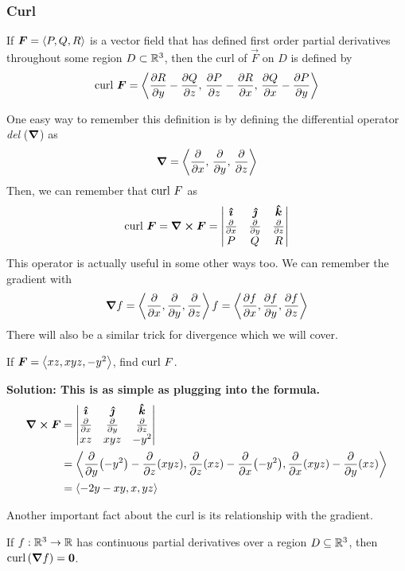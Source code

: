 \subsubsection{Curl}
\begin{definition}
    If $\boldsymbol{F} = \left\langle P, Q, R\right\rangle$ is a vector field that has defined first order partial derivatives throughout some region $D\subset \mathbb{R}^3$, then the curl of $\vec F$ on $D$ is defined by
    \[ \operatorname{curl}\, \boldsymbol{F} = \left\langle\pdv{R}{y}-\pdv{Q}{z},\, \pdv{P}{z}-\pdv{R}{x},\,\pdv{Q}{x}-\pdv{P}{y}\right\rangle\]
\end{definition}
One easy way to remember this definition is by defining the differential operator \textit{del} ($\boldsymbol{\boldsymbol\nabla}$) as
\[ \boldsymbol{\boldsymbol\nabla} = \left\langle \pdv{}{x}, \, \pdv{}{y},\,\pdv{}{z}\right\rangle\]
Then, we can remember that $\operatorname{curl}\, F$ as
\[ \operatorname{curl}\, \boldsymbol{F} = \curl\boldsymbol{F} = \begin{vmatrix}
    \boldsymbol{\hat{\imath}} & \boldsymbol{\hat{\jmath}} & \boldsymbol{\hat{k}} \\
    \pdv{}{x} & \pdv{}{y} & \pdv{}{z} \\
    P & Q & R
\end{vmatrix}    
\]
This operator is actually useful in some other ways too. We can remember the gradient with
\[ \boldsymbol\nabla f = \left\langle \pdv{}{x}, \pdv{}{y}, \pdv{}{z}\right\rangle f = \left\langle \pdv{f}{x}, \pdv{f}{y}, \pdv{f}{z}\right\rangle\]
There will also be a similar trick for divergence which we will cover. \par
\begin{example}
    If $\boldsymbol{F} = \left\langle xz, xyz, -y^2\right\rangle$, find $\operatorname{curl}\, F$. \par
    \bf{Solution:} This is as simple as plugging into the formula.
    \begin{align*}
        \curl \boldsymbol{F} &=  \begin{vmatrix}
    \boldsymbol{\hat{\imath}} & \boldsymbol{\hat{\jmath}} & \boldsymbol{\hat{k}} \\
    \pdv{}{x} & \pdv{}{y} & \pdv{}{z} \\
    xz & xyz & -y^2
\end{vmatrix} \\ &= \left\langle \pdv{y}(-y^2) - \pdv{z}(xyz), \pdv{z}(xz) - \pdv{x}(-y^2), \pdv{x}(xyz)-\pdv{y}(xz)\right\rangle \\
&= \left\langle -2y - xy, x, yz\right\rangle
    \end{align*}
\end{example}
Another important fact about the curl is its relationship with the gradient.
\begin{theorem}\label{curlgrad}
    If $f: \mathbb{R}^3\to \mathbb{R}$ has continuous partial derivatives over a region $D\subseteq\mathbb{R}^3$, then $\operatorname{curl}\,(\boldsymbol\nabla f) = \boldsymbol{0}$.
\end{theorem}
